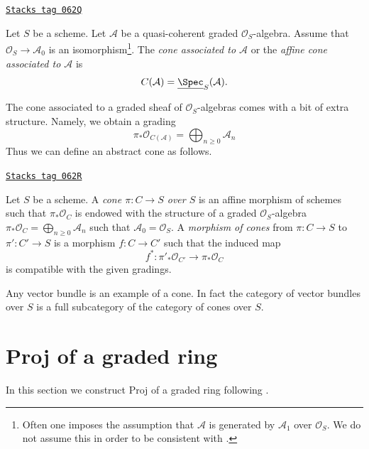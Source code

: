\begin{definition}[Cone]
\label{constructions-definition-cone}
\href{https://stacks.math.columbia.edu/tag/062Q}{\texttt{Stacks tag 062Q}}

Let $S$ be a scheme. Let $\mathcal{A}$ be a quasi-coherent
graded $\mathcal{O}_S$-algebra. Assume that $\mathcal{O}_S \to \mathcal{A}_0$
is an isomorphism\footnote{Often one imposes the assumption that
$\mathcal{A}$ is generated by $\mathcal{A}_1$ over $\mathcal{O}_S$. We do not
assume this in order to be consistent with \cite[II, (8.3.1)]{EGA}.}.
The {\it cone associated to $\mathcal{A}$} or the
{\it affine cone associated to $\mathcal{A}$}
is
$$
C(\mathcal{A}) = \underline{\Spec}_S(\mathcal{A}).
$$
\end{definition}

The cone associated to a graded sheaf of $\mathcal{O}_S$-algebras
comes with a bit of extra structure. Namely, we obtain a grading
$$
\pi_*\mathcal{O}_{C(\mathcal{A})} =
\bigoplus\nolimits_{n \geq 0} \mathcal{A}_n
$$
Thus we can define an abstract cone as follows.

\begin{definition}
\label{constructions-definition-abstract-cone}
\href{https://stacks.math.columbia.edu/tag/062R}{\texttt{Stacks tag 062R}}

Let $S$ be a scheme. A {\it cone $\pi : C \to S$ over $S$} is an
affine morphism of schemes such that $\pi_*\mathcal{O}_C$ is endowed with
the structure of a graded $\mathcal{O}_S$-algebra
$\pi_*\mathcal{O}_C = \bigoplus\nolimits_{n \geq 0} \mathcal{A}_n$
such that $\mathcal{A}_0 = \mathcal{O}_S$. A {\it morphism of cones}
from $\pi : C \to S$ to $\pi' : C' \to S$
is a morphism $f : C \to C'$ such that the induced map
$$
f^* : \pi'_*\mathcal{O}_{C'} \longrightarrow \pi_*\mathcal{O}_C
$$
is compatible with the given gradings.
\end{definition}

Any vector bundle is an example of a cone. In fact the category of
vector bundles over $S$ is a full subcategory of the category of cones
over $S$.

\section{Proj of a graded ring}
\label{constructions-section-proj}
In this section we construct Proj of a graded ring
following \cite[II, Section 2]{EGA}.


